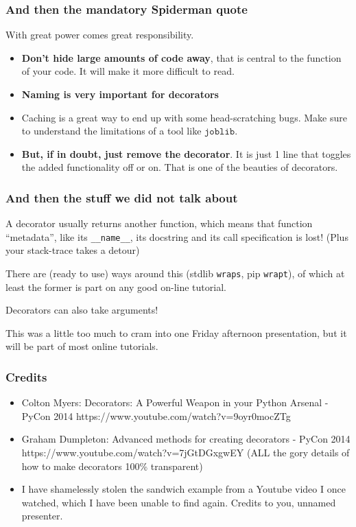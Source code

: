 \documentclass{beamer}
\begin{document}
\begin{frame}
  \frametitle{And then the mandatory Spiderman quote}
  \begin{alertblock}{\vspace*{-3ex}}
    With great power comes great responsibility.
  \end{alertblock}
  \begin{itemize}
  \item \textbf{Don't hide large amounts of code away}, that is central to the
    function of your code. It will make it more difficult to read.
  \item \textbf{Naming is very important for decorators}
  \item Caching is a great way to end up with some head-scratching bugs. Make
    sure to understand the limitations of a tool like $\texttt{joblib}$.
  \item \textbf{But, if in doubt, just remove the decorator}. It is just 1
    line that toggles the added functionality off or on. That is one of the
    beauties of decorators.
  \end{itemize}
\end{frame}

\begin{frame}
  \frametitle{And then the stuff we did not talk about}
  \begin{alertblock}{\vspace*{-3ex}}
    A decorator usually returns another function, which means that
    function ``metadata'', like its \texttt{\_\_name\_\_}, its
    docstring and its call specification is lost! \footnotesize(Plus
    your stack-trace takes a detour)
  \end{alertblock}
  There are (ready to use) ways around this (stdlib \texttt{wraps}, pip
  \texttt{wrapt}), of which at least the former is part on any good on-line
  tutorial.
  \begin{block}{\vspace*{-3ex}}
    Decorators can also take arguments!
  \end{block}
  This was a little too much to cram into one Friday afternoon presentation, but it will be part of most online tutorials.
\end{frame}

\begin{frame}
  \frametitle{Credits}
  \begin{itemize}
  \item Colton Myers: Decorators: A Powerful Weapon in your Python
    Arsenal - PyCon 2014 https://www.youtube.com/watch?v=9oyr0mocZTg
  \item Graham Dumpleton: Advanced methods for creating decorators -
    PyCon 2014 https://www.youtube.com/watch?v=7jGtDGxgwEY
    ({\color{darkred}ALL the gory details of how to make decorators
      100\% transparent})
  \item {\color{black}}I have shamelessly stolen the sandwich example
    from a Youtube video I once watched, which I have been
    unable to find again. Credits to you, unnamed presenter.
  \end{itemize}
\end{frame}
\end{document}
